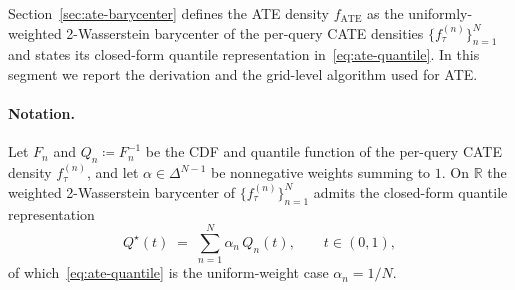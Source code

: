 \documentclass[11pt]{article}
\begin{document}
Section~\ref{sec:ate-barycenter} defines the ATE density
$f_{\mathrm{ATE}}$ as the uniformly-weighted 2-Wasserstein barycenter
of the per-query CATE densities $\{f_{\tau}^{(n)}\}_{n=1}^{N}$ and
states its closed-form quantile representation
in~\eqref{eq:ate-quantile}. In this segment we report the derivation and the
grid-level algorithm used for ATE.

\paragraph{Notation.}
Let $F_{n}$ and $Q_{n} \coloneqq F_{n}^{-1}$ be the CDF and quantile
function of the per-query CATE density $f_{\tau}^{(n)}$, and let
$\alpha \in \Delta^{N-1}$ be nonnegative weights summing to $1$. On
$\mathbb{R}$ the weighted 2-Wasserstein barycenter of
$\{f_{\tau}^{(n)}\}_{n=1}^{N}$ admits the closed-form quantile
representation
\begin{equation}
  Q^{\star}(t)
  \;=\;
  \sum_{n=1}^{N} \alpha_{n}\, Q_{n}(t),
  \qquad
  t \in (0, 1),
  \label{eq:agueh-carlier}
\end{equation}
of which~\eqref{eq:ate-quantile} is the uniform-weight case $\alpha_{n} = 1/N$.
\end{document}
